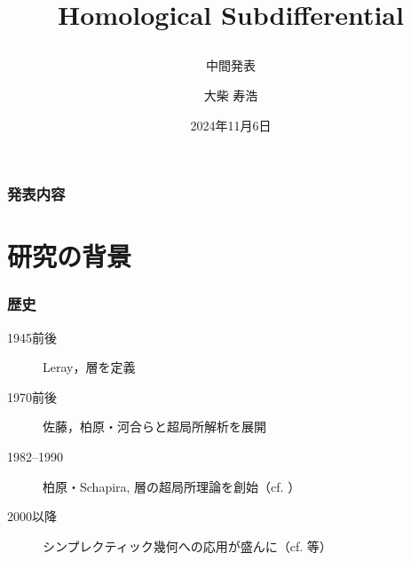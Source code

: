 \documentclass[dvipdfmx,12pt,aspectratio=169,leqno]{beamer}%
\title{Homological Subdifferential
\subtitle{中間発表}}
\date{2024年11月6日}
\author{大柴 寿浩}
\numberwithin{equation}{subsection}
\theoremstyle{mystyle}
\begin{document}
\begin{frame}
    \titlepage
\end{frame}

\begin{frame}
    \frametitle{発表内容}
    \tableofcontents
\end{frame}



\section[背景]{研究の背景}

\begin{frame}
    \frametitle{歴史}
    \begin{description}
        \item[1945前後] Leray，層を定義\cite{Ler45}
        \item[1970前後] 佐藤，柏原・河合らと超局所解析を展開\cite{SKK73}
        \item[1982--1990] 柏原・Schapira, 層の超局所理論を創始（cf. \cite{KS90}）
        \item[2000以降] シンプレクティック幾何への応用が盛んに（cf. \cite{GKS12}等）   
    \end{description}
\end{frame}
\end{document}
